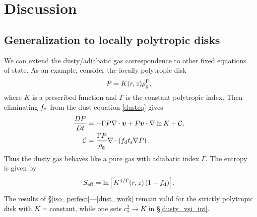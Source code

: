 \section{Discussion}\label{discussion}

\subsection{Generalization to locally polytropic disks}\label{gen_poly}

We can extend the dusty/adiabatic gas correspondence to 
other fixed equations of state. As an example, consider the locally
polytropic disk 
\begin{align}
  P = K(r,z)\rho_\mathrm{g}^{\Gamma}, 
\end{align}
where $K$ is a prescribed function and $\Gamma$ is the constant
polytropic index. Then eliminating $f_\mathrm{d}$ from the dust equation
\ref{dusteq} gives 
\begin{align}\label{poly_energy}
  \frac{D P}{D t} &= - \Gamma P\nabla\cdot\bm{v}  + P \bm{v}\cdot\nabla
  \ln{K} + \mathcal{C},\\
  \mathcal{C}& = \frac{\Gamma P}{\rho_\mathrm{g}}\nabla\cdot\left(f_\mathrm{d}t_\mathrm{s}\nabla
  P\right).
\end{align}
Thus the dusty gas behaves like a pure gas with adiabatic index
$\Gamma$. The entropy is given by 
\begin{align}
  S_\mathrm{eff} = \ln{\left[K^{1/\Gamma}(r,z)\left(1 - f_\mathrm{d}\right)\right]}.  
\end{align}
The results of \S\ref{iso_perfect}---\ref{dust_work} remain valid for the strictly 
polytropic disk with $K=$constant, while one sets $c_s^2\to K$ in
\S\ref{dusty_vsi_int}. 








